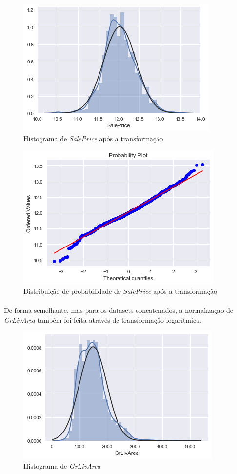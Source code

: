 \documentclass{article}
\begin{document}
			\begin{figure}[H]
				\centering
				\includegraphics[scale=0.8]{../img/saleprice_norm_after_1}
				\caption{Histograma de \textit{SalePrice} após a transformação}
			\end{figure}
			
			\begin{figure}[H]
				\centering
				\includegraphics[scale=0.8]{../img/saleprice_norm_after_2}
				\caption{Distribuição de probabilidade de \textit{SalePrice} após a transformação}
			\end{figure}
			
			\paragraph{}De forma semelhante, mas para os datasets concatenados, a normalização de \textit{GrLivArea} também foi feita através de transformação logarítmica.
			
			\begin{figure}[H]
				\centering
				\includegraphics[scale=0.8]{../img/grlivearea_norm_1}
				\caption{Histograma de \textit{GrLivArea}}
			\end{figure}
			
\end{document}
